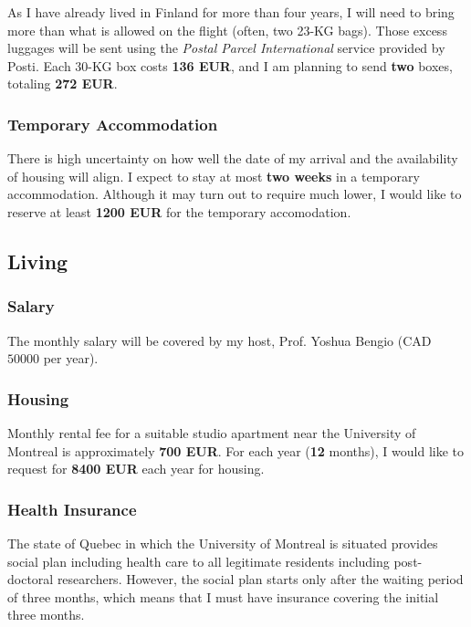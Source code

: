 \documentclass[11pt, oneside]{essay}
\begin{document}
As I have already lived in Finland for more than four years,
I will need to bring more than what is allowed on the flight
(often, two 23-KG bags). Those excess luggages will be sent
using the \textit{Postal Parcel International} service
provided by Posti. Each 30-KG box costs \textbf{136 EUR},
and I am planning to send \textbf{two} boxes, totaling
\textbf{272 EUR}.

\subsubsection{Temporary Accommodation}

There is high uncertainty on how well the date of my arrival and
the availability of housing will align. I expect to stay at most
\textbf{two weeks} in a temporary accommodation. Although it may
turn out to require much lower, I would like to reserve at least
\textbf{1200 EUR} for the temporary accomodation.


\subsection{Living}

\subsubsection{Salary}

The monthly salary will be covered by my
host, Prof. Yoshua Bengio (CAD $50000$ per year).

\subsubsection{Housing}

Monthly rental fee for a suitable studio apartment near the
University of Montreal is approximately \textbf{700 EUR}. For
each year (\textbf{12} months), I would like to request for
\textbf{8400 EUR} each year for housing.

\subsubsection{Health Insurance}

The state of Quebec in which the University of Montreal is
situated provides social plan including health care to
all legitimate residents including post-doctoral researchers.
However, the social plan starts only after the waiting period of
three months, which means that I must have insurance
covering the initial three months. 
\end{document}
